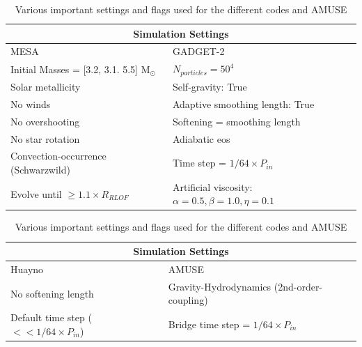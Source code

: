 \begin{table}[H]
    \centering
    \begin{tabular}{ |p{6.5cm}||p{6.5cm}|  }
     \hline
     \multicolumn{2}{|c|}{Simulation Settings} \\
     \hline
     MESA & GADGET-2 \\
     \hline
     Initial Masses = [3.2, 3.1. 5.5] M$_{\odot}$& $N_{particles}=50^4$ \\
     Solar metallicity& Self-gravity: True\\
     No winds& Adaptive smoothing length: True\\
     No overshooting& Softening = smoothing length\\
     No star rotation & Adiabatic \ac{eos}  \\
     Convection-occurrence (Schwarzwild) & Time step = $1/64 \times P_{in}$ \\
     Evolve until $\geq 1.1 \times R_{RLOF}$ & Artificial viscosity: $\alpha=0.5, \beta=1.0, \eta=0.1$ \\
     \hline
    \end{tabular}
        \centering
    \begin{tabular}{ |p{6.5cm}||p{6.5cm}|  }
     \hline
     \multicolumn{2}{|c|}{Simulation Settings} \\
     \hline
     Huayno & AMUSE \\
     \hline
     No softening length & Gravity-Hydrodynamics (2nd-order-coupling)\\
     Default time step ($<< 1/64 \times P_{in}$) &  Bridge time step = $1/64 \times P_{in}$\\
     \hline
    \end{tabular}
    \caption{ Various important settings and flags used for the different codes and AMUSE}
\label{tab:codes_settings}
\end{table}
